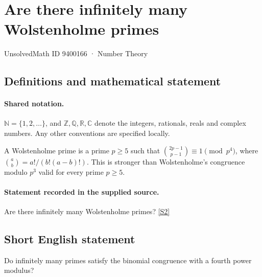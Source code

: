\documentclass[11pt]{article}
\newcommand{\sref}[2]{\hyperlink{source:#1:#2}{[S#2]}}
\begin{document}
\setcounter{section}{9400165}
\section{Are there infinitely many Wolstenholme primes}\label{9400166}
{\small\sffamily UnsolvedMath ID 9400166 · Number Theory}
\subsection{Definitions and mathematical statement}

\paragraph{Shared notation.}$\mathbb N=\{1,2,\ldots\}$, and $\mathbb Z,\mathbb Q,\mathbb R,\mathbb C$ denote the integers, rationals, reals and complex numbers. Any other conventions are specified locally.


A Wolstenholme prime is a prime $p\ge5$ such that $\binom{2p-1}{p-1}\equiv1\pmod{p^4}$, where $\binom ab=a!/(b!(a-b)!)$. This is stronger than Wolstenholme's congruence modulo $p^3$ valid for every prime $p\ge5$.
\paragraph{Statement recorded in the supplied source.}
Are there infinitely many Wolstenholme primes? \sref{9400166}{2}
\subsection{Short English statement}
Do infinitely many primes satisfy the binomial congruence with a fourth power modulus?
\end{document}
